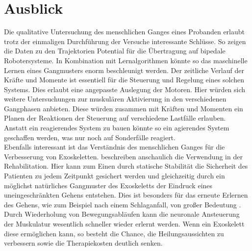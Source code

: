 \section{Ausblick}
Die qualitative Untersuchung des menschlichen Ganges eines Probanden erlaubt trotz der einmaligen Durchführung der Versuche interessante Schlüsse. So zeigen die Daten zu den Trajektorien Potential für die Übertragung auf bipedale Robotersysteme. In Kombination mit Lernalgorithmen könnte so das maschinelle Lernen eines Gangmusters enorm beschleunigt werden. Der zeitliche Verlauf der Kräfte und Momente ist essentiell für die Steuerung und Regelung eines solchen Systems. Dies erlaubt eine angepasste Auslegung der Motoren. Hier würden sich weitere Untersuchungen zur muskulären Aktivierung in den verschiedenen Gangphasen anbieten. Diese würden zusammen mit Kräften und Momenten ein Planen der Reaktionen der Steuerung auf verschiedene Lastfälle erlauben. Anstatt ein reagierendes System zu bauen könnte so ein agierendes System geschaffen werden, was nur noch auf Sonderfälle reagiert.\\
Ebenfalls interessant ist das Verständnis des menschlichen Ganges für die Verbesserung von Exoskeletten. \textcite{barbareschi2015statically} beschreiben anschaulich die Verwendung in der Rehabilitation. Hier kann zum Einen durch statische Stabilität die Sicherheit des Patienten zu jedem Zeitpunkt gesichert werden und gleichzeitig durch ein möglichst natürliches Gangmuster des Exoskeletts der Eindruck eines uneingeschränkten Gehens entstehen. Dies ist besonders für das erneute Erlernen des Gehens, wie zum Beispiel nach einem Schlaganfall, von großer Bedeutung \parencite{yin2012emg}. Durch Wiederholung von Bewegungsabläufen kann die neuronale Ansteuerung der Muskulatur wesentlich schneller wieder erlernt werden. Wenn ein Exoskelett diese ermöglichen kann, so besteht die Chance, die Heilungsaussichten zu verbessern sowie die Therapiekosten deutlich senken.
